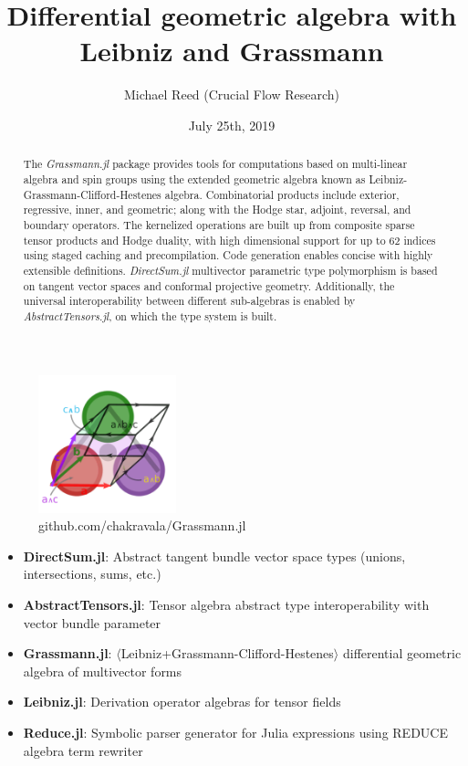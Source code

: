 \documentclass{juliacon}
\author{Michael Reed (Crucial Flow Research)}
\title{Differential geometric algebra with Leibniz and Grassmann}
\date{July 25th, 2019}
\begin{document}
%

\maketitle
\begin{figure}[ht]
\centerline{\includegraphics[width=4cm]{../docs/src/assets/logo.png}}
\caption*{github.com/chakravala/Grassmann.jl}
\end{figure}
\begin{abstract}
	The \textit{Grassmann.jl}
	package provides tools for computations based on multi-linear algebra and spin groups using the extended geometric algebra known as Leibniz-Grassmann-Clifford-Hestenes algebra.
	Combinatorial products include
	exterior, regressive, inner, and geometric; along with the Hodge star, adjoint, reversal, and boundary operators.
	The kernelized operations are built up from composite sparse tensor products and Hodge duality, with high dimensional support for up to 62 indices using staged caching and precompilation. Code generation enables concise with highly extensible definitions.
	\textit{DirectSum.jl}
	multivector parametric type polymorphism is based on tangent vector spaces and conformal projective geometry.
	Additionally, the universal interoperability between different sub-algebras is enabled by \textit{AbstractTensors.jl},
	on which the type system is built.
\end{abstract}
\begin{itemize}
	\item \textbf{DirectSum.jl}: Abstract tangent bundle vector space types (unions, intersections, sums, etc.)
	\item \textbf{AbstractTensors.jl}: Tensor algebra abstract type interoperability with vector bundle parameter
	\item \textbf{Grassmann.jl}: $\langle$Leibniz+Grassmann-Clifford-Hestenes$\rangle$ differential geometric algebra of multivector forms
	\item \textbf{Leibniz.jl}: Derivation operator algebras for tensor fields
	\item \textbf{Reduce.jl}: Symbolic parser generator for Julia expressions using REDUCE algebra term rewriter
\end{itemize}
\end{document}
